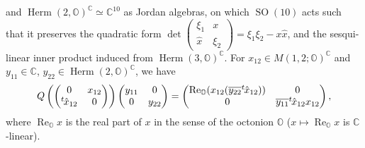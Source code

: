 \documentclass[pdftex]{sigma}
\numberwithin{equation}{section}
\newcommand{\BC}{\mathbb{C}}
\newcommand{\BO}{\mathbb{O}}
\newcommand{\Herm}{\operatorname{Herm}}
\renewcommand{\Re}{\operatorname{Re}}
\begin{document}
and $\Herm(2,\BO)^\BC\simeq\BC^{10}$ as Jordan algebras, on which $\operatorname{SO}(10)$ acts such that it preserves the quadratic form
$\det\left(\begin{smallmatrix}\xi_1&x\\\hat{x}&\xi_2\end{smallmatrix}\right)=\xi_1\xi_2-x\hat{x}$, and the sesqui-linear inner product
induced from $\Herm(3,\BO)^\BC$. For $x_{12}\in M(1,2;\BO)^\BC$ and $y_{11}\in\BC$, $y_{22}\in\Herm(2,\BO)^\BC$, we have
\begin{gather*} Q\left(\begin{pmatrix}0&x_{12}\\{}^t\hspace{-1pt}\hat{x}_{12}&0\end{pmatrix}\right)\begin{pmatrix}y_{11}&0\\0&y_{22}\end{pmatrix}
=\begin{pmatrix}\Re_\BO(x_{12}(\overline{y_{22}}{}^t\hspace{-1pt}\hat{x}_{12}))&0\\
0&\overline{y_{11}}{}^t\hspace{-1pt}\hat{x}_{12}x_{12}\end{pmatrix}, \end{gather*}
where $\Re_\BO x$ is the real part of $x$ in the sense of the octonion $\BO$ ($x\mapsto \Re_\BO x$ is $\BC$-linear).
\end{document}
